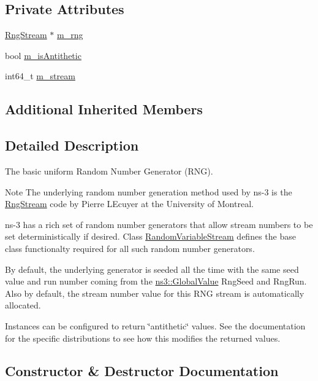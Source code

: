 \subsection*{Private Attributes}
\begin{DoxyCompactItemize}
\item 
\hyperlink{classns3_1_1RngStream}{Rng\+Stream} $\ast$ \hyperlink{classns3_1_1RandomVariableStream_ad944ab349eeee833c43ddcc7c749d1fe}{m\+\_\+rng}
\item 
bool \hyperlink{classns3_1_1RandomVariableStream_a91017ccb003344625d469b3f5caf5c0e}{m\+\_\+is\+Antithetic}
\item 
int64\+\_\+t \hyperlink{classns3_1_1RandomVariableStream_ab494eafbd56af49c75b504cf5b712ae7}{m\+\_\+stream}
\end{DoxyCompactItemize}
\subsection*{Additional Inherited Members}


\subsection{Detailed Description}
The basic uniform Random Number Generator (R\+NG). 

\begin{DoxyNote}{Note}
The underlying random number generation method used by ns-\/3 is the \hyperlink{classns3_1_1RngStream}{Rng\+Stream} code by Pierre L\textquotesingle{}Ecuyer at the University of Montreal.
\end{DoxyNote}
ns-\/3 has a rich set of random number generators that allow stream numbers to be set deterministically if desired. Class \hyperlink{classns3_1_1RandomVariableStream}{Random\+Variable\+Stream} defines the base class functionalty required for all such random number generators.

By default, the underlying generator is seeded all the time with the same seed value and run number coming from the \hyperlink{classns3_1_1GlobalValue}{ns3\+::\+Global\+Value} Rng\+Seed and Rng\+Run. Also by default, the stream number value for this R\+NG stream is automatically allocated.

Instances can be configured to return \char`\"{}antithetic\char`\"{} values. See the documentation for the specific distributions to see how this modifies the returned values. 

\subsection{Constructor \& Destructor Documentation}
